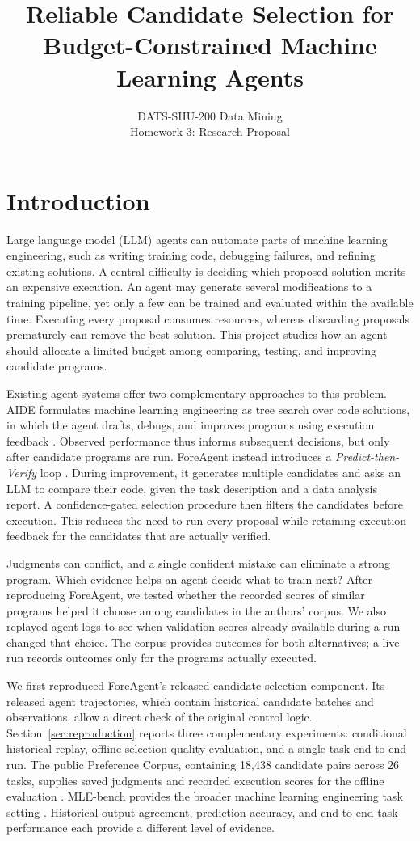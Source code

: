 \documentclass{article}
\title{Reliable Candidate Selection for\\Budget-Constrained Machine Learning Agents}
\author{DATS-SHU-200 Data Mining\\Homework 3: Research Proposal}
\begin{document}
\maketitle

\section{Introduction}

Large language model (LLM) agents can automate parts of machine learning engineering, such as writing training code, debugging failures, and refining existing solutions. A central difficulty is deciding which proposed solution merits an expensive execution. An agent may generate several modifications to a training pipeline, yet only a few can be trained and evaluated within the available time. Executing every proposal consumes resources, whereas discarding proposals prematurely can remove the best solution. This project studies how an agent should allocate a limited budget among comparing, testing, and improving candidate programs.

Existing agent systems offer two complementary approaches to this problem. AIDE formulates machine learning engineering as tree search over code solutions, in which the agent drafts, debugs, and improves programs using execution feedback \citep{jiang2025aide}. Observed performance thus informs subsequent decisions, but only after candidate programs are run. ForeAgent instead introduces a \emph{Predict-then-Verify} loop \citep{zheng2026predict}. During improvement, it generates multiple candidates and asks an LLM to compare their code, given the task description and a data analysis report. A confidence-gated selection procedure then filters the candidates before execution. This reduces the need to run every proposal while retaining execution feedback for the candidates that are actually verified.

Judgments can conflict, and a single confident mistake can eliminate a strong program. Which evidence helps an agent decide what to train next? After reproducing ForeAgent, we tested whether the recorded scores of similar programs helped it choose among candidates in the authors' corpus. We also replayed agent logs to see when validation scores already available during a run changed that choice. The corpus provides outcomes for both alternatives; a live run records outcomes only for the programs actually executed.

We first reproduced ForeAgent's released candidate-selection component. Its released agent trajectories, which contain historical candidate batches and observations, allow a direct check of the original control logic. Section~\ref{sec:reproduction} reports three complementary experiments: conditional historical replay, offline selection-quality evaluation, and a single-task end-to-end run. The public Preference Corpus, containing 18,438 candidate pairs across 26 tasks, supplies saved judgments and recorded execution scores for the offline evaluation \citep{zheng2026predict}. MLE-bench provides the broader machine learning engineering task setting \citep{chan2024mle}. Historical-output agreement, prediction accuracy, and end-to-end task performance each provide a different level of evidence.
\end{document}
